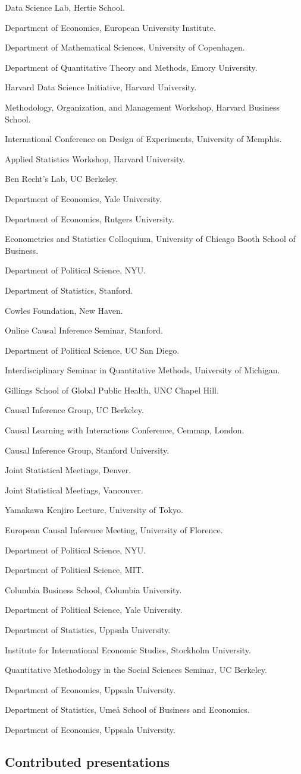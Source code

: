\documentclass[10pt,letterpaper]{article}
\newenvironment{singledatelist}{
	\begin{list}{}{
		\setlength{\parskip}{0pt}
		\setlength{\itemsep}{4pt}
		\setlength{\parsep}{0.3em}
		\setlength{\leftmargin}{3.5em}
		\setlength{\labelwidth}{3.5em}
		\setlength{\labelsep}{1.5em}
		}
	}{
\end{list}
}
\newcommand{\dateitem}[2][]{\item[{#1}] {#2}}
\begin{document}
	\begin{singledatelist}
		\dateitem[2024]{Data Science Lab, Hertie School.}
		\dateitem{Department of Economics, European University Institute.}
		\dateitem{Department of Mathematical Sciences, University of Copenhagen.}
		\dateitem{Department of Quantitative Theory and Methods, Emory University.}
		\dateitem{Harvard Data Science Initiative, Harvard University.}
		\dateitem[2023]{Methodology, Organization, and Management Workshop, Harvard Business School.}
		\dateitem{International Conference on Design of Experiments, University of Memphis.}
		\dateitem{Applied Statistics Workshop, Harvard University.}
		\dateitem{Ben Recht's Lab, UC Berkeley.}
		\dateitem{Department of Economics, Yale University.}
		\dateitem[2021]{Department of Economics, Rutgers University.}
		\dateitem{Econometrics and Statistics Colloquium, University of Chicago Booth School of Business.}
		\dateitem{Department of Political Science, NYU.}
		\dateitem{Department of Statistics, Stanford.}
		\dateitem{Cowles Foundation, New Haven.}
		\dateitem{Online Causal Inference Seminar, Stanford.}
		\dateitem[2020]{Department of Political Science, UC San Diego.}
		\dateitem{Interdisciplinary Seminar in Quantitative Methods, University of Michigan.}
		\dateitem{Gillings School of Global Public Health, UNC Chapel Hill.}
		\dateitem{Causal Inference Group, UC Berkeley.}
		\dateitem[2019]{Causal Learning with Interactions Conference, Cemmap, London.}
		\dateitem{Causal Inference Group, Stanford University.}
		\dateitem{Joint Statistical Meetings, Denver.}
		\dateitem[2018]{Joint Statistical Meetings, Vancouver.}
		\dateitem{Yamakawa Kenjiro Lecture, University of Tokyo.}
		\dateitem{European Causal Inference Meeting, University of Florence.}
		\dateitem{Department of Political Science, NYU.}
		\dateitem{Department of Political Science, MIT.}
		\dateitem[2016]{Columbia Business School, Columbia University.}
		\dateitem[2015]{Department of Political Science, Yale University.}
		\dateitem{Department of Statistics, Uppsala University.}
		\dateitem{Institute for International Economic Studies, Stockholm University.}
		\dateitem[2014]{Quantitative Methodology in the Social Sciences Seminar, UC Berkeley.}
		\dateitem{Department of Economics, Uppsala University.}
		\dateitem[2013]{Department of Statistics, Umeå School of Business and Economics.}
		\dateitem[2012]{Department of Economics, Uppsala University.}
	\end{singledatelist}


	\subsection*{Contributed presentations}
\end{document}
